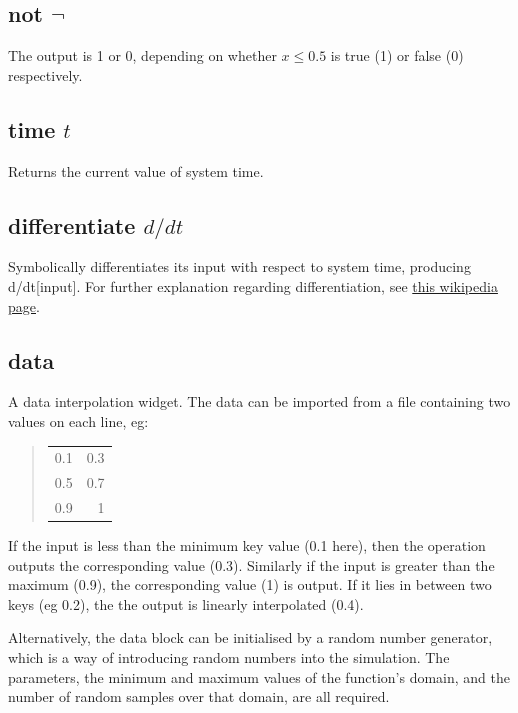 \subsection{not $\neg$}\label{Operation:not_} The output is 1 or 0, depending
  on whether $x\le0.5$ is true (1) or false (0) respectively.

\subsection{time $t$}\label{Operation:time}  Returns the current value of system time.

\subsection{differentiate $d/dt$}\label{Operation:differentiate}
Symbolically differentiates its input with respect to system time, producing d/dt[input]. 
For further explanation regarding differentiation, see \href{https://en.wikipedia.org/wiki/Derivative}{this wikipedia page}.

\subsection{data }\label{Operation:data}  A data interpolation
widget. The data can be imported from a file containing
two values on each line, eg:
\begin{quote}
\begin{tabular}{rr}
0.1 &0.3\\
0.5 &0.7\\
0.9 &1\\
\end{tabular}
\end{quote}

If the input is less than the minimum key value (0.1 here), then the
operation outputs the corresponding value (0.3). Similarly if the
input is greater than the maximum (0.9), the corresponding value (1)
is output. If it lies in between two keys (eg 0.2), the the output is
linearly interpolated (0.4).

Alternatively, the data block can be initialised by a random number
generator, which is a way of introducing random numbers into the simulation. The parameters, the
minimum and maximum values of the function's domain, and the number of
random samples over that domain, are all required.

